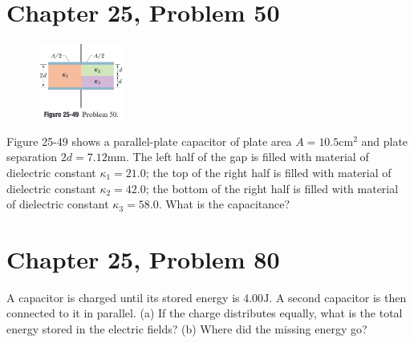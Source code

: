 \documentclass[12pt]{article}
\begin{document}
\section{Chapter 25, Problem 50}
\begin{figure}
    \vspace{-30pt}
    \includegraphics[width=0.25\textwidth]{picture_11.png} 
\end{figure}
Figure 25-49 shows a parallel-plate capacitor of plate area $A = 10.5 \unit{\centi\meter^2}$ and plate separation $2d = 7.12 \unit{\milli\meter}$. The left half of the gap is filled with material of dielectric constant $\kappa_1 = 21.0$; the top of the right half is filled with material of dielectric constant $\kappa_2 = 42.0$; the bottom of the right half is
filled with material of dielectric constant $\kappa_3 = 58.0$. What is the capacitance?

\section{Chapter 25, Problem 80}
A capacitor is charged until its stored energy is $4.00 \unit{\joule}$. A second capacitor is then connected to it in parallel. (a) If the charge distributes equally, what is the total energy stored in the electric fields? (b) Where did the missing energy go?
\end{document}
